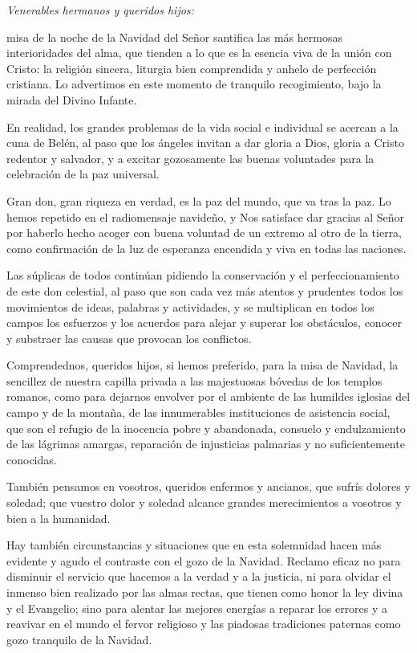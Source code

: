 \begin{body}
	\emph{Venerables hermanos y queridos hijos:}
	
	 misa de la noche de la Navidad del Señor santifica las más hermosas interioridades del alma, que tienden a lo que es la esencia viva de la unión con Cristo: la religión sincera, liturgia bien comprendida y anhelo de perfección cristiana. Lo advertimos en este momento de tranquilo recogimiento, bajo la mirada del Divino Infante.
	
	En realidad, los grandes problemas de la vida social e individual se acercan a la cuna de Belén, al paso que los ángeles invitan a dar gloria a Dios, gloria a Cristo redentor y salvador, y a excitar gozosamente las buenas voluntades para la celebración de la paz universal.
	
	Gran don, gran riqueza en verdad, es la paz del mundo, que va tras la paz. Lo hemos repetido en el radiomensaje navideño, y Nos satisface dar gracias al Señor por haberlo hecho acoger con buena voluntad de un extremo al otro de la tierra, como confirmación de la luz de esperanza encendida y viva en todas las naciones.
	
	Las súplicas de todos continúan pidiendo la conservación y el perfeccionamiento de este don celestial, al paso que son cada vez más atentos y prudentes todos los movimientos de ideas, palabras y actividades, y se multiplican en todos los campos los esfuerzos y los acuerdos para alejar y superar los obstáculos, conocer y substraer las causas que provocan los conflictos.
	
	Comprendednos, queridos hijos, si hemos preferido, para la misa de Navidad, la sencillez de nuestra capilla privada a las majestuosas bóvedas de los templos romanos, como para dejarnos envolver por el ambiente de las humildes iglesias del campo y de la montaña, de las innumerables instituciones de asistencia social, que son el refugio de la inocencia pobre y abandonada, consuelo y endulzamiento de las lágrimas amargas, reparación de injusticias palmarias y no suficientemente conocidas.
	
	También pensamos en vosotros, queridos enfermos y ancianos, que sufrís dolores y soledad; que vuestro dolor y soledad alcance grandes merecimientos a vosotros y bien a la humanidad.
	
	Hay también circunstancias y situaciones que en esta solemnidad hacen más evidente y agudo el contraste con el gozo de la Navidad. Reclamo eficaz no para disminuir el servicio que hacemos a la verdad y a la justicia, ni para olvidar el inmenso bien realizado por las almas rectas, que tienen como honor la ley divina y el Evangelio; sino para alentar las mejores energías a reparar los errores y a reavivar en el mundo el fervor religioso y las piadosas tradiciones paternas como gozo tranquilo de la Navidad.
	

\end{body}
